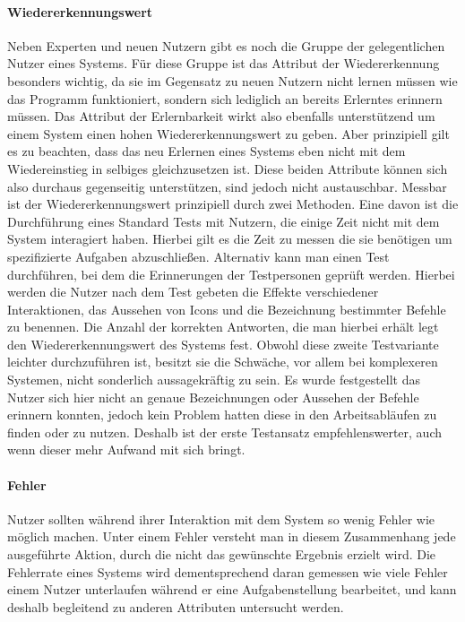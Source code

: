 \paragraph{Wiedererkennungswert}
Neben Experten und neuen Nutzern gibt es noch die Gruppe der gelegentlichen Nutzer eines Systems.
Für diese Gruppe ist das Attribut der Wiedererkennung besonders wichtig, da sie im Gegensatz zu neuen Nutzern nicht lernen müssen wie das Programm funktioniert, sondern sich lediglich an bereits Erlerntes erinnern müssen.
Das Attribut der Erlernbarkeit wirkt also ebenfalls unterstützend um einem System einen hohen Wiedererkennungswert zu geben.
Aber prinzipiell gilt es zu beachten, dass das neu Erlernen eines Systems eben nicht mit dem Wiedereinstieg in selbiges gleichzusetzen ist.
Diese beiden Attribute können sich also durchaus gegenseitig unterstützen, sind jedoch nicht austauschbar.
Messbar ist der Wiedererkennungswert prinzipiell durch zwei Methoden.
Eine davon ist die Durchführung eines Standard Tests mit Nutzern, die einige Zeit nicht mit dem System interagiert haben.
Hierbei gilt es die Zeit zu messen die sie benötigen um spezifizierte Aufgaben abzuschließen.
Alternativ kann man einen Test durchführen, bei dem die Erinnerungen der Testpersonen geprüft werden.
Hierbei werden die Nutzer nach dem Test gebeten die Effekte verschiedener Interaktionen, das Aussehen von Icons und die Bezeichnung bestimmter Befehle zu benennen.
Die Anzahl der korrekten Antworten, die man hierbei erhält legt den Wiedererkennungswert des Systems fest.
Obwohl diese zweite Testvariante leichter durchzuführen ist, besitzt sie die Schwäche, vor allem bei komplexeren Systemen, nicht sonderlich aussagekräftig zu sein.
Es wurde festgestellt das Nutzer sich hier nicht an genaue Bezeichnungen oder Aussehen der Befehle erinnern konnten, jedoch kein Problem hatten diese in den Arbeitsabläufen zu finden oder zu nutzen.
Deshalb ist der erste Testansatz empfehlenswerter, auch wenn dieser mehr Aufwand mit sich bringt\cite{Nielsen.1995?}.

\paragraph{Fehler}
Nutzer sollten während ihrer Interaktion mit dem System so wenig Fehler wie möglich machen. 
Unter einem Fehler versteht man in diesem Zusammenhang jede ausgeführte Aktion, durch die nicht das gewünschte Ergebnis erzielt wird.
Die Fehlerrate eines Systems wird dementsprechend daran gemessen wie viele Fehler einem Nutzer unterlaufen während er eine Aufgabenstellung bearbeitet, und kann deshalb begleitend zu anderen Attributen untersucht werden\cite{Nielsen.1995?}.

